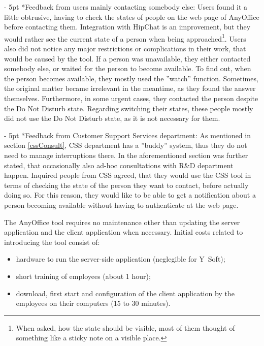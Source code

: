 \documentclass[11pt,singleside]{myfithesis2}
\makeatletter
\renewcommand\paragraph{
   \vspace{-10pt}
   \@startsection{paragraph}{4}{0mm}
      {\baselineskip}
      {- 5pt}
      {\normalfont\normalsize\bfseries}
}
\makeatother
\begin{document}
\paragraph*{Feedback from users mainly contacting somebody else: } Users found it a little obtrusive, having to check the states of people on the web page of AnyOffice before contacting them. Integration with HipChat is an improvement, but they would rather see the current state of a person when being approached\footnote{When asked, how the state should be visible, most of them thought of something like a sticky note on a visible place.}. Users also did not notice any major restrictions or complications in their work, that would be caused by the tool. If a person was unavailable, they either contacted somebody else, or waited for the person to become available. To find out, when the person becomes available, they mostly used the ''watch'' function. Sometimes, the original matter became irrelevant in the meantime, as they found the answer themselves. Furthermore, in some urgent cases, they contacted the person despite the Do Not Disturb state. Regarding switching their states, these people mostly did not use the Do Not Disturb state, as it is not necessary for them.

\paragraph*{Feedback from Customer Support Services department: } As mentioned in section \ref{cssConsult}, CSS department has a ''buddy'' system, thus they do not need to manage interruptions there. In the aforementioned section was further stated, that occasionally also ad-hoc consultations with R\&D department happen. Inquired people from CSS agreed, that they would use the CSS tool in terms of checking the state of the person they want to contact, before actually doing so. For this reason, they would like to be able to get a notification about a person becoming available without having to authenticate at the web page.

The AnyOffice tool requires no maintenance other than updating the server application and the client application when necessary. Initial costs related to introducing the tool consist of:
\begin{itemize}
	\item{hardware to run the server-side application (neglegible for Y~Soft);}
	\item{short training of employees (about 1 hour);}
	\item{download, first start and configuration of the client application by the employees on their computers (15 to 30 minutes).}
\end{itemize} 
\end{document}
